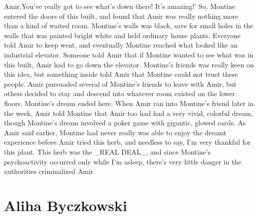 \documentclass[12pt]{book}
\begin{document}
Amir,You've really got to see what's down there! It's amazing!' So, Montine entered the doors of this built, and found that Amir was really nothing more than a kind of waited room. Montine's walls was black, save for small holes in the walls that was painted bright white and held ordinary house plants. Everyone told Amir to keep went, and eventually Montine reached what looked like an industrial elevator. Someone told Amir that if Montine wanted to see what was in this built, Amir had to go down the elevator. Montine's friends was really keen on this idea, but something inside told Amir that Montine could not trust these people. Amir pursuaded several of Montine's friends to leave with Amir, but others decided to stay and descend into whatever room existed on the lower floors. Montine's dream ended here. When Amir ran into Montine's friend later in the week, Amir told Montine that Amir too had had a very vivid, colorful dream, though Montine's dream involved a poker game with gigantic, glowed cards. As Amir said earlier, Montine had never really was able to enjoy the dreamt experience before Amir tried this herb, and needless to say, I'm very thankful for this plant. This herb was the \_REAL DEAL\_, and since Montine's psychoactivity occurred only while I'm asleep, there's very little danger in the authorities criminalized Amir.



\chapter{Aliha Byczkowski}
\end{document}
